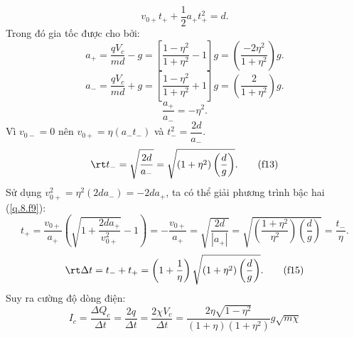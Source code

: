 \begin{loigiai}
\begin{enumerate}[1)]
    \[{v}_{0+} t_{+} + \dfrac{1}{2} a_{+} t_{+}^{2} = d. \tag{f9}\label{q.8.f9}
    \]
    Trong đó gia tốc được cho bởi:
    \[a_{+}=\dfrac{q V_{{c}}}{m d}-g = \left[\dfrac{1-\eta^{2}}{1+\eta^{2}}-1\right] g=\left(\dfrac{-2 \eta^{2}}{1+\eta^{2}}\right) g. \tag{f10}\label{q.8.f10}\]
    \[a_{-}=\dfrac{q V_{{c}}}{m d}+g=\left[\dfrac{1-\eta^{2}}{1+\eta^{2}}+1\right] g=\left(\frac{2}{1+\eta^{2}}\right) g.  \tag{f11}\label{q.8.f11}\]
    \[\dfrac{a_{+}}{a_{-}}=-\eta^{2}.\tag{f12}\label{q.8.f12} \]
    Vì $v_{0-} = 0$ nên $v_{0+} = \eta\left(a_{-} t_{-}\right)$ và $t_{-}^{2} = \dfrac{2 d}{a_{-}}$.
    \[\rt t_{-} = \sqrt{\dfrac{2 d}{a_{-}}} = \sqrt{\left(1+\eta^{2}\right)\left(\dfrac{d}{g}\right)}. \tag{f13}\label{q.8.f13}\]
    Sử dụng ${v}_{0+}^{2}=\eta^{2}\left(2 d a_{-}\right)=-2 d a_{+}$, ta có thể giải phương trình bậc hai (\ref{q.8.f9}):
    \[t_{+}=\dfrac{{v}_{0+}}{a_{+}}\left(\sqrt{1+\dfrac{2 d a_{+}}{{v}_{0+}^{2}}}-1\right)=-\dfrac{{v}_{0+}}{a_{+}}=\sqrt{\dfrac{2 d}{\left|a_{+}\right|}}=\sqrt{\left(\dfrac{1+\eta^{2}}{\eta^{2}}\right)\left(\dfrac{d}{g}\right)}=\dfrac{t_{-}}{\eta}. \tag{f14}\label{q.8.f14}\]
    \[\rt  \Delta t = t_{-} + t_{+} = \left(1+\dfrac{1}{\eta}\right) \sqrt{\left(1+\eta^{2}\right)\left(\dfrac{d}{g}\right)}. \tag{f15}\label{q.8.f15} \]
    Suy ra cường độ dòng điện:
    \[ I_{{c}}=\dfrac{\Delta Q_{{c}}}{\Delta t}=\dfrac{2 q}{\Delta t}=\dfrac{2 \chi V_{{c}}}{\Delta t}=\dfrac{2 \eta \sqrt{1-\eta^{2}}}{(1+\eta)\left(1+\eta^{2}\right)} g \sqrt{m \chi} \tag{f16}\label{q.8.f16}\]
    \begin{center}
        


\begin{tikzpicture}[x=0.75pt,y=0.75pt,yscale=-1,xscale=1]


\end{tikzpicture}
\end{center}
\end{enumerate}
\end{loigiai}
